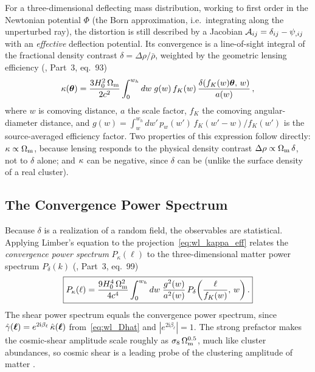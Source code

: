 For a three-dimensional deflecting mass distribution, working to first
order in the Newtonian potential $\Phi$ (the Born approximation, i.e.\
integrating along the unperturbed ray), the distortion is still described
by a Jacobian $\mathcal{A}_{ij} = \delta_{ij} - \psi_{,ij}$ with an
\textit{effective} deflection potential.  Its convergence is a
line-of-sight integral of the fractional density contrast
$\delta = \Delta\rho/\bar\rho$, weighted by the geometric lensing
efficiency
(\citealp{schneider_kochanek_wambsganss_2006}, Part~3, eq.~93)
\begin{equation}
    \kappa(\boldsymbol{\theta})
    = \frac{3 H_0^2\,\Omega_{\mathrm{m}}}{2c^2}
    \int_0^{w_h} dw\; g(w)\, f_K(w)\,
    \frac{\delta\!\left(f_K(w)\boldsymbol{\theta},\, w\right)}{a(w)}\,,
    \label{eq:wl_kappa_eff}
\end{equation}
where $w$ is comoving distance, $a$ the scale factor, $f_K$ the comoving
angular-diameter distance, and $g(w) = \int_w^{w_h} dw'\, p_w(w')\,
f_K(w'-w)/f_K(w')$ is the source-averaged efficiency factor.  Two
properties of this expression follow directly: $\kappa \propto \Omega_{\mathrm{m}}$,
because lensing responds to the physical density contrast
$\Delta\rho \propto \Omega_{\mathrm{m}}\,\delta$, not to $\delta$ alone; and $\kappa$
can be negative, since $\delta$ can be (unlike the surface density of a
real cluster).

\subsection{The Convergence Power Spectrum}

Because $\delta$ is a realization of a random field, the observables are
statistical.  Applying Limber's equation to the
projection~\eqref{eq:wl_kappa_eff} relates the \emph{convergence power
spectrum} $P_\kappa(\ell)$ to the three-dimensional matter power spectrum
$P_\delta(k)$
(\citealp{schneider_kochanek_wambsganss_2006}, Part~3, eq.~99)
\begin{equation}
    \boxed{
    P_\kappa(\ell) = \frac{9 H_0^4\,\Omega_{\mathrm{m}}^2}{4c^4}
    \int_0^{w_h} dw\;
    \frac{g^2(w)}{a^2(w)}\,
    P_\delta\!\left(\frac{\ell}{f_K(w)},\, w\right).
    }
    \label{eq:wl_Pkappa}
\end{equation}
The shear power spectrum equals the convergence power spectrum, since
$\hat{\gamma}(\boldsymbol\ell) = e^{2\mathrm{i}\beta_\ell}\,
\hat{\kappa}(\boldsymbol\ell)$ from~\eqref{eq:wl_Dhat} and $|e^{2\mathrm
i\beta_\ell}| = 1$.  The strong prefactor makes the cosmic-shear amplitude
scale roughly as $\sigma_8\,\Omega_{\mathrm{m}}^{0.5}$, much like cluster abundances,
so cosmic shear is a leading probe of the clustering amplitude of matter
\citep[][Part~3, Sect.~6.4]{schneider_kochanek_wambsganss_2006}.

